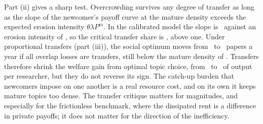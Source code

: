 Part (ii) gives a sharp test. Overcrowding survives any degree of transfer as
long as the slope of the newcomer's payoff curve at the mature density exceeds
the expected erosion intensity $\theta\lambda P^m$. In the calibrated model the
slope is \calEpsW\ against an erosion intensity of \calThetaLamPm, so the
critical transfer share is \calTauCrit, above one. Under proportional
transfers (part (iii)), the social optimum moves from \calPsocialZero\ to
\calPsocialFull\ papers a year if all overlap losses are transfers, still below
the mature density of \calPm. Transfers therefore shrink the welfare gain from
optimal topic choice, from \calPlannerGain\ to \calGainTransfer\ of output per
researcher, but they do not reverse its sign. The catch-up burden that newcomers
impose on one another is a real resource cost, and on its own it keeps mature
topics too dense. The transfer critique matters for magnitudes, and especially
for the frictionless benchmark, where the dissipated rent is a difference in
private payoffs; it does not matter for the direction of the inefficiency.
